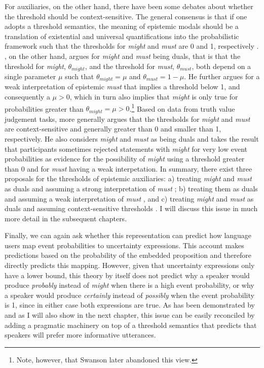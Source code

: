 For auxiliaries, on the other hand, there have been some debates about whether the threshold should be context-sensitive. The general consensus is that if one adopts a threshold semantics,
the meaning of epistemic modals should be a translation of existential and universal quantifications into the probabilistic framework such that the thresholds for \textit{might} and \textit{must} are 0 and 1, respectively .
\textcite{Swanson2006}, on the other hand, argues for \textit{might} and \textit{must} being duals, that is that the threshold for \textit{might}, $\theta_{might}$, 
and the threshold for \textit{must}, $\theta_{must}$, both depend on a single parameter $\mu$ such that  $\theta_{might} = \mu$ and  $\theta_{must} = 1 - \mu$. 
He further argues for a weak interpretation of epistemic \textit{must} that implies a threshold below 1, and consequently a $\mu > 0$, which in turn also implies
that  \textit{might} is only true for probabilities greater than $\theta_{might} = \mu > 0$.\footnote{Note, however, that Swanson later abandoned this view.}  Based on data from truth value judgement tasks, \textcite{Lassiter2016} 
more generally argues that the thresholds for \textit{might} and \textit{must} are context-sensitive and generally greater than 0 and smaller than 1, respectively. 
He also considers \textit{might} and \textit{must} as being duals and takes the result that participants sometimes rejected statements with \textit{might} for very low
event probabilities as evidence for the possibility of \textit{might} using a threshold greater than 0 and for \textit{must} having a weak interpetation.
In summary, there exist three proposals for the thresholds of epistemic auxiliaries: a) treating \textit{might} and \textit{must} as duals and assuming a strong interpretation
of \textit{must} \cite{Yalcin2010}; b) treating them as duals and assuming a weak interpretation of \textit{must} \cite{Swanson2006}, and c) treating \textit{might} and
\textit{must} as duals and assuming context-sensitive thresholds \cite{Lassiter2016}. I will discuss this issue in much more detail in the subsequent chapters.

Finally, we can again ask whether this representation can predict how language users map event probabilities to uncertainty expressions.
This account makes predictions based on the probability of the embedded proposition and therefore directly predicts this mapping. However, given that uncertainty expressions
only have a lower bound, this theory by itself does not predict why a speaker would produce \textit{probably} instead of \textit{might} when there is
a high event probability, or why a speaker would produce \textit{certainly} instead of \textit{possibly} when the event probability is 1, since
in either case both expressions are true. As has been demonstrated by \textcite{Herbstritt2019} and as I will also show in the next chapter, this
issue can be easily reconciled by adding a pragmatic machinery on top of a threshold semantics that predicts that speakers will prefer more informative
utterances. 

